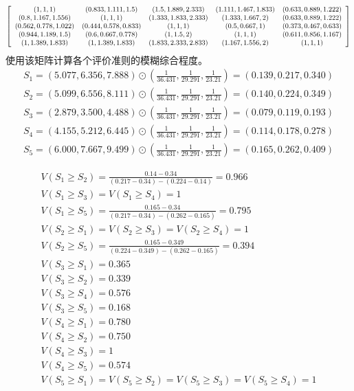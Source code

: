 \documentclass[winfonts,UTF8]{ctexart}
\begin{document}
\[
\left[
\small
  \begin{array}{ccccc}
    (1,1,1)&(0.833,1.111,1.5)&(1.5,1.889,2.333)&(1.111,1.467,1.833)&(0.633,0.889,1.222)\\
    (0.8,1.167,1.556)&(1,1,1)&(1.333,1.833,2.333)&(1.333,1.667,2)&(0.633,0.889,1.222)\\
    (0.562,0.778,1.022)&(0.444,0.578,0.833)&(1,1,1)&(0.5,0.667,1)&(0.373,0.467,0.633)\\
    (0.944,1.189,1.5)&(0.6,0.667,0.778)&(1,1.5,2)&(1,1,1)&(0.611,0.856,1.167)\\
    (1,1.389,1.833)&(1,1.389,1.833)&(1.833,2.333,2.833)&(1.167,1.556,2)&(1,1,1)\\
  \end{array}
\right]
\]
使用该矩阵计算各个评价准则的模糊综合程度。
\begin{eqnarray*}
  \label{eq:1}
  S_1 =
(5.077,6.356,7.888)\odot(\frac{1}{36.431},\frac{1}{29.291},\frac{1}{23.21})=(0.139,0.217,0.340)\\
S_2 =
(5.099,6.556,8.111)\odot(\frac{1}{36.431},\frac{1}{29.291},\frac{1}{23.21})=(0.140,0.224,0.349)\\
S_3 =
(2.879,3.500,4.488)\odot(\frac{1}{36.431},\frac{1}{29.291},\frac{1}{23.21})=(0.079,0.119,0.193)\\
S_4
=(4.155,5.212,6.445)\odot(\frac{1}{36.431},\frac{1}{29.291},\frac{1}{23.21})=(0.114,0.178,0.278)\\
S_5 =(6.000,7.667,9.499)\odot(\frac{1}{36.431},\frac{1}{29.291},\frac{1}{23.21})=(0.165,0.262,0.409)
\end{eqnarray*}

\begin{eqnarray*}
  \label{eq:2}
V(S_1\geq S_2)=  \frac{0.14-0.34}{(0.217-0.34)-(0.224-0.14)}=0.966\\
V(S_1\geq S_3)=V(S_1\geq S_4)=1\\
V(S_1\geq S_5)=\frac{0.165-0.34}{(0.217-0.34)-(0.262-0.165)}=0.795\\
V(S_2\geq S_1)=V(S_2\geq S_3)=V(S_2\geq S_4)=1\\
V(S_2\geq S_5)=\frac{0.165-0.349}{(0.224-0.349)-(0.262-0.165)}=0.394\\
V(S_3\geq S_1)=0.365\\
V(S_3\geq S_2)=0.339\\
V(S_3\geq S_4)=0.576\\
V(S_3\geq S_5)=0.168\\
V(S_4\geq S_1)=0.780\\
V(S_4\geq S_2)=0.750\\
V(S_4\geq S_3)=1\\
V(S_4\geq S_5)=0.574\\
V(S_5\geq S_1)=V(S_5\geq S_2)=V(S_5\geq S_3)=V(S_5\geq S_4)=1
\end{eqnarray*}
\end{document}
